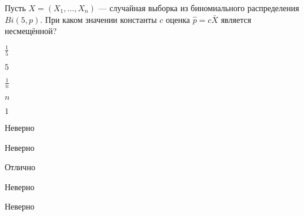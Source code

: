 
\begin{question}
Пусть \(X = (X_1, \ldots , X_n)\) --- случайная выборка из биномиального
распределения \(Bi(5, p)\). При каком значении константы \(c\) оценка
\(\hat{p} = c \bar{X}\) является несмещённой?
\begin{answerlist}
  \item \(\frac{1}{5}\)
  \item \(5\)
  \item \(\frac{1}{n}\)
  \item \(n\)
  \item \(1\)
\end{answerlist}
\end{question}

\begin{solution}
\begin{answerlist}
  \item Неверно
  \item Неверно
  \item Отлично
  \item Неверно
  \item Неверно
\end{answerlist}
\end{solution}


